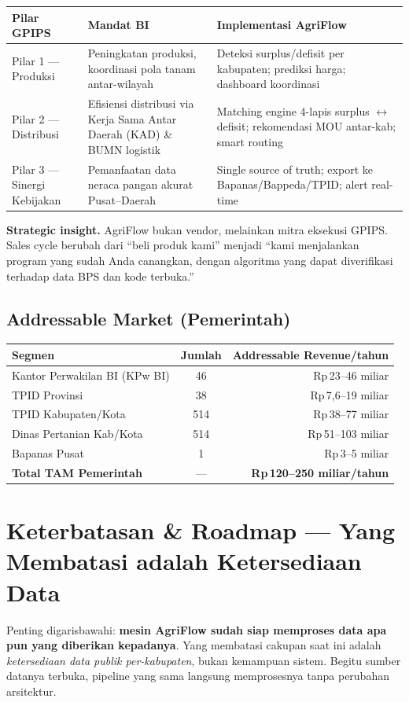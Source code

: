 \documentclass[11pt,a4paper]{article}
\newcommand{\rp}{Rp\,}
\begin{document}
\begin{center}
\begin{longtable}{p{2.6cm}p{5.4cm}p{6.4cm}}
\toprule
\textbf{Pilar GPIPS} & \textbf{Mandat BI} & \textbf{Implementasi AgriFlow} \\
\midrule
\endhead
Pilar 1 --- Produksi & Peningkatan produksi, koordinasi pola tanam antar-wilayah & Deteksi
surplus/defisit per kabupaten; prediksi harga; dashboard koordinasi \\
Pilar 2 --- Distribusi & Efisiensi distribusi via Kerja Sama Antar Daerah (KAD) \& BUMN logistik &
Matching engine 4-lapis surplus $\leftrightarrow$ defisit; rekomendasi MOU antar-kab; smart routing \\
Pilar 3 --- Sinergi Kebijakan & Pemanfaatan data neraca pangan akurat Pusat--Daerah & Single
source of truth; export ke Bapanas/Bappeda/TPID; alert real-time \\
\bottomrule
\end{longtable}
\end{center}

\noindent\textbf{Strategic insight.} AgriFlow bukan vendor, melainkan mitra eksekusi GPIPS.
Sales cycle berubah dari ``beli produk kami'' menjadi ``kami menjalankan program yang sudah Anda
canangkan, dengan algoritma yang dapat diverifikasi terhadap data BPS dan kode terbuka.''

\subsection{Addressable Market (Pemerintah)}
\begin{center}
\begin{tabular}{lcr}
\toprule
\textbf{Segmen} & \textbf{Jumlah} & \textbf{Addressable Revenue/tahun} \\
\midrule
Kantor Perwakilan BI (KPw BI) & 46 & \rp 23--46 miliar \\
TPID Provinsi & 38 & \rp 7,6--19 miliar \\
TPID Kabupaten/Kota & 514 & \rp 38--77 miliar \\
Dinas Pertanian Kab/Kota & 514 & \rp 51--103 miliar \\
Bapanas Pusat & 1 & \rp 3--5 miliar \\
\midrule
\textbf{Total TAM Pemerintah} & --- & \textbf{\rp 120--250 miliar/tahun} \\
\bottomrule
\end{tabular}
\end{center}

\section{Keterbatasan \& Roadmap --- Yang Membatasi adalah Ketersediaan Data}
Penting digarisbawahi: \textbf{mesin AgriFlow sudah siap memproses data apa pun yang diberikan
kepadanya}. Yang membatasi cakupan saat ini adalah \emph{ketersediaan data publik
per-kabupaten}, bukan kemampuan sistem. Begitu sumber datanya terbuka, pipeline yang sama
langsung memprosesnya tanpa perubahan arsitektur.
\end{document}
